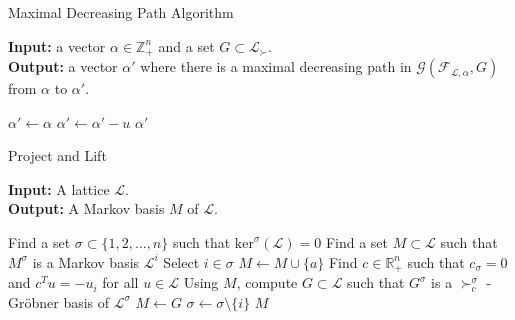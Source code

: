 \documentclass[9pt]{beamer}
\newcommand\R{\mathbb{R}}
\newcommand\F{\mathcal{F}}
\newcommand\G{\mathcal{G}}
\newcommand\set[1]{\{#1\}}
\newcommand\Z{\mathbb{Z}}
\theoremstyle{definition}
\begin{document}
\begin{frame}[fragile]{Maximal Decreasing Path Algorithm}
  
  \begin{algorithm}[H]
    \textbf{Input:} a vector $\alpha \in \Z^n_+$ and a set $G \subset \mathcal{L}_{\succ}$. \\
    \textbf{Output:} a vector $\alpha'$ where there is a  maximal decreasing path in
    $\G(\F_{\mathcal{L}, \alpha}, G)$ from $\alpha$ to $\alpha'$.
    \begin{algorithmic}[1]
      \STATE $\alpha' \leftarrow \alpha$
      \STATE $\alpha' \leftarrow \alpha' - u$
      \ENDWHILE
      \RETURN $\alpha'$
    \end{algorithmic}
  \end{algorithm}

\end{frame}

\begin{frame}[fragile]{Project and Lift}
  
  \begin{algorithm}[H]
    \textbf{Input:} A lattice $\mathcal{L}$. \\
    \textbf{Output:} A Markov basis $M$ of $\mathcal{L}$.
    \begin{algorithmic}[1]
      \STATE Find a set $\sigma \subset \set{1, 2, \dots, n}$ such that $\text{ker}^{\sigma}(\mathcal{L}) = 0$
      \STATE Find a set $M \subset \mathcal{L}$ such that $M^{\sigma}$ is a Markov basis $\mathcal{L}^i$
      \WHILE{ $\sigma \neq \emptyset$}
      \STATE Select $i \in \sigma$
      \STATE $M \leftarrow M \cup \set{ a }$
      \ELSE
      \STATE Find $c \in \R^n_+$ such that $c_{\sigma} = 0$ and $c^{T} u = -u_i$ for all $u \in \mathcal{L}$
      \STATE Using $M$, compute $G \subset \mathcal{L}$ such that $G^{\sigma}$ is a $\succ_c^{\sigma}$ - Gr\"obner basis of $\mathcal{L}^{\sigma}$
      \STATE $M \leftarrow G$
      \ENDIF
      \STATE $\sigma \leftarrow \sigma \setminus \set{i}$
      \ENDWHILE
      \RETURN $M$
    \end{algorithmic}
  \end{algorithm}

\end{frame}
\end{document}
